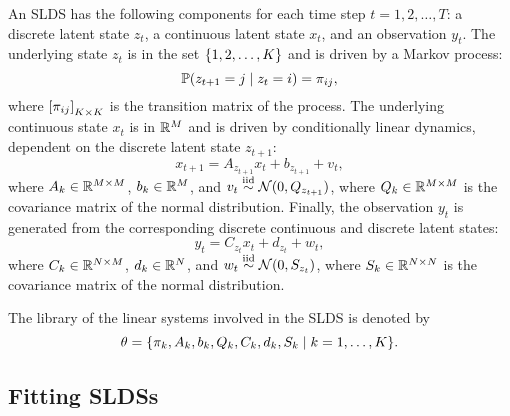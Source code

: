An SLDS has the following components for each time step $t = 1,2, \dots, T$: a discrete latent state $z_t$, a continuous latent state $x_t$, and an observation $y_t$. The underlying state $z_t$ is in the set ${\left\{1,2,\dots,K\right\}}$ and is driven by a Markov process:
\[\mathbb{P}(z_{t+1} = j \mid z_t = i) = \pi_{ij}, \]
where ${\left[\pi_{ij}\right]}_{K\times K}$ is the transition matrix of the process. The underlying continuous state $x_t$ is in $\mathbb{R}^M$ and is driven by conditionally linear dynamics, dependent on the discrete latent state $z_{t+1}$:
\[x_{t+1} = A_{z_{t+1}} x_t + b_{z_{t+1}} + v_t, \]
where $A_k\in\mathbb{R}^{M\times M}$, $b_k\in \mathbb{R}^M$, and $v_t \overset{\mathrm{iid}}{\sim} \mathcal{N}(0,Q_{z_{t+1}})$, where $Q_k\in\mathbb{R}^{M\times M}$ is the covariance matrix of the normal distribution. Finally, the observation $y_t$ is generated from the corresponding discrete continuous and discrete latent states:
\[y_t = C_{z_{t}} x_t + d_{z_{t}} + w_t,\]
where $C_k\in\mathbb{R}^{N\times M}$, $d_k\in \mathbb{R}^N$, and $w_t \overset{\mathrm{iid}}{\sim} \mathcal{N}(0,S_{z_{t}})$, where $S_k\in\mathbb{R}^{N\times N}$ is the covariance matrix of the normal distribution.

The library of the linear systems involved in the SLDS is denoted by
\[\theta = {\left\{\pi_k, A_k, b_k, Q_k, C_k, d_k, S_k \mid k = 1, \dots, K\right\}}.\]

\subsection{Fitting SLDSs}

  

